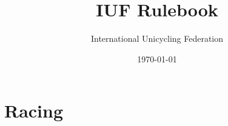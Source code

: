 \documentclass[a4paper,oneside]{scrbook}
\title{IUF Rulebook}
\author{International Unicycling Federation}
\date{\today}
\begin{document}
\maketitle

\doparttoc
\tableofcontents



\part{Racing}
\parttoc

\end{document}
